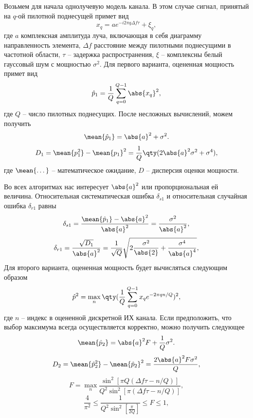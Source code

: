 Возьмем для начала однолучевую модель канала. В этом случае сигнал, принятый на $q$-ой пилотной поднесущей примет вид
\begin{equation}
    x_q = a e^{-i2\pi q\Delta f \tau} + \xi_q,
\end{equation}
где $a$ комплексная амплитуда луча, включающая в себя диаграмму направленность
элемента, $\Delta f$ расстояние между пилотными поднесущими в частотной области,
$\tau$ -- задержка распространения, $\xi$ -- комплексны белый гауссовый шум с
мощностью $\sigma^2$.
Для первого варианта, оцененная мощность примет вид
\begin{equation}
    \hat p_1 = \frac{1}{Q} \sum\limits_{q = 0}^{Q - 1} \abs{x_q}^2,
\end{equation}
где $Q$ -- число пилотных поднесущих. После несложных вычислений, можем получить
\begin{equation}
    \mean{\hat p_1} = \abs{a}^2 + \sigma^2.
\end{equation}
\begin{equation}
    D_1 = \mean{p_1^2} - \mean{p_1}^2 = \frac{1}{Q}\qty(2\abs{a}^2 \sigma^2 + \sigma^4),
\end{equation}
где $\mean{\dots}$ -- математическое ожидание, $D$ -- дисперсия оценки мощности.



Во всех алгоритмах нас интересует $\abs{a}^2$ или пропорциональная ей величина.
Относительная систематическая ошибка $\delta_{s1}$ и относительная случайная ошибка $\delta_{r1}$ равны
\begin{equation}
    \delta_{s1} = \frac{\mean{\hat p_1} - \abs{a}^2}{\abs{a}^2} = \frac{\sigma^2}{\abs{a}^2},
\end{equation}
\begin{equation}
    \delta_{r1} = \frac{\sqrt{D_1}}{\abs{a}^2} =
    \frac{1}{\sqrt{Q}} \sqrt{2 \frac{\sigma^2}{\abs{2}} +
        \frac{\sigma^4}{\abs{a}^4}},
\end{equation}
Для второго варианта, оцененная мощность будет вычисляться следующим образом
\begin{equation}
    \hat p^2 = \max_n\qty(\frac{1}{Q} \sum\limits_{q=0}^{Q-1} x_q e^{-2 \pi q n /Q})^2,
\end{equation}
где $n$ -- индекс в оцененной дискретной ИХ канала. 
Если предположить, что выбор максимума всегда осуществляется корректно, можно
получить следующее
\begin{equation}
    \mean{\hat p_2} = \abs{a}^2 F + \frac{1}{Q}\sigma^2.
\end{equation}
\begin{equation}
    D_2 = \mean{\hat p_2^2} - \mean{\hat p_2}^2 = \frac{2\abs{a}^2 F \sigma^2}{Q},
\end{equation}
\begin{equation}
    F = \max_n \frac{\sin^2[\pi Q (\Delta f \tau - n/Q)]}{Q^2 \sin^2[\pi(\Delta f \tau - n/Q)]},
\end{equation}
\begin{equation}
    \frac{4}{\pi^2} \leq \frac{1}{Q^2 \sin^2[\frac{\pi}{2Q}]} \leq F \leq 1,
\end{equation}


